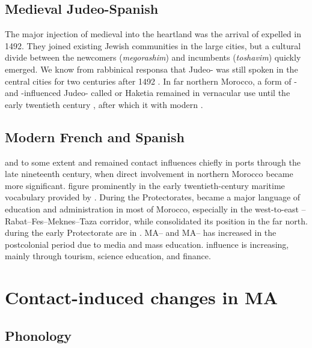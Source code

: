 \documentclass[output=paper]{langsci/langscibook}
\begin{document}
\subsection{Medieval Judeo-Spanish}

The major injection of medieval  into the  heartland was the arrival of expelled   in 1492. They joined existing Jewish communities in the large cities, but a cultural divide between the newcomers (\textit{megorashim}) and incumbents (\textit{toshavim}) quickly emerged. We know from rabbinical responsa that Judeo- was still spoken in the central cities for two centuries after 1492 \citep{Chetrit1985}. In far northern Morocco, a form of - and -influenced Judeo- called  or Haketia remained in vernacular use until the early twentieth century \citep{Benoliel1977}, after which it  with modern .

\subsection{Modern French and Spanish}

 and to some extent  and  remained contact influences chiefly in ports through the late nineteenth century, when direct  involvement in northern Morocco became more significant.   figure prominently in the early twentieth-century maritime vocabulary provided by \citet{Brunot1920}. During the Protectorates,  became a major language of education and administration in most of Morocco, especially in the west-to-east –Rabat–Fes–Meknes–Taza corridor, while  consolidated its position in the far north.   during the early Protectorate are in \citet{Brunot1949}. MA– and MA–  has increased in the postcolonial period due to media and mass education.  influence is increasing, mainly through tourism, science education, and finance.

\section{Contact-induced changes in MA}

\subsection{Phonology}
\end{document}
